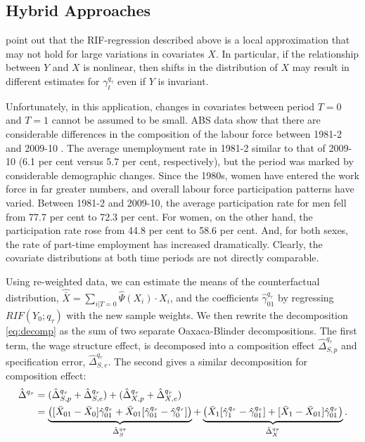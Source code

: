 \subsection{Hybrid Approaches}\label{sec:reweight}

\citet[p.19]{Firpo2011} point out that the RIF-regression described above is a local approximation that may not hold for large variations in covariates $X$. In particular, if the relationship between $Y$ and $X$ is nonlinear, then shifts in the distribution of $X$ may result in different estimates for $\gamma^{q_\tau}_t$ even if $Y$ is invariant. 

Unfortunately, in this application, changes in covariates between period $T=0$ and $T=1$ cannot be assumed to be small. ABS data show that there are considerable differences in the composition of the labour force between 1981-2 and 2009-10 \citep{LFSApr2013}. The average unemployment rate in 1981-2 similar to that of 2009-10 (6.1 per cent versus 5.7 per cent, respectively), but the period was marked by considerable demographic changes. Since the 1980s, women have entered the work force in far greater numbers, and overall labour force participation patterns have varied. Between 1981-2 and 2009-10, the average participation rate for men fell from 77.7 per cent to 72.3 per cent. For women, on the other hand, the participation rate rose from 44.8 per cent to 58.6 per cent. And, for both sexes, the rate of part-time employment has increased dramatically. Clearly, the covariate distributions at both time periods are not directly comparable.

Using re-weighted data, we can estimate the means of the counterfactual distribution, $\hat{\bar{X}}=\sum_{i|T=0}\hat{\Psi}(X_i) \cdot X_i$, and the coefficients $\hat{\gamma}_{01}^{q_\tau}$ by regressing $RIF(Y_0;q_\tau)$ with the new sample weights. We then rewrite the decomposition \eqref{eq:decomp} as the sum of two separate Oaxaca-Blinder decompositions. The first term, the wage structure effect, is decomposed into a composition effect $\hat{\Delta}^{q_\tau}_{S,p}$ and specification error, $\hat{\Delta}^{q_\tau}_{S,e}$. The second gives a similar decomposition for composition effect:
\begin{align}
  \hat{\Delta}^{q_\tau} &= (\hat{\Delta}^{q_\tau}_{S,p} + \hat{\Delta}^{q_\tau}_{S,e}) + (\hat{\Delta}^{q_\tau}_{X,p} + \hat{\Delta}^{q_\tau}_{X,e}) \notag \\
  &= \underbrace{\left( [\bar{X}_{01} - \bar{X}_0 ] \hat{\gamma}^{q_\tau}_{01} +
    \bar{X}_{01}[\hat{\gamma}_{01}^{q_\tau} - \hat{\gamma}_0^{q_\tau}] \right)}_{\hat{\Delta}^{q_\tau}_{S}} +
  \underbrace{\left( \bar{X}_{1}[\hat{\gamma}_{1}^{q_\tau} - \hat{\gamma}_{01}^{q_\tau}] + 
    [\bar{X}_{1} - \bar{X}_{01} ] \hat{\gamma}^{q_\tau}_{01}\right)}_{\hat{\Delta}^{q_\tau}_{X}}.
\end{align}

